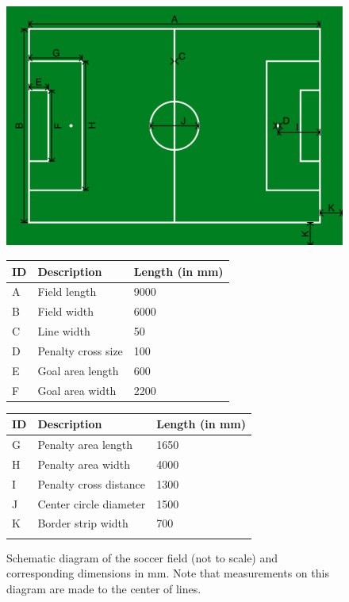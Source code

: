 \begin{figure}[b!]
\centering
\centerline{\includegraphics[width=\columnwidth]{figs/fieldDimensions2020.pdf}}
\vspace{1ex}
\begin{tabular}{| l | l | l |}
ID & Description & Length (in mm) \\
\hline \hline
A & Field length & 9000 \\
\hline
B & Field width & 6000 \\
\hline
C & Line width & 50 \\
\hline
D & Penalty cross size & 100 \\
\hline
E & Goal area length & 600 \\
\hline
F & Goal area width & 2200 \\
\end{tabular}
\begin{tabular}{|l|l|l|}
ID & Description & Length (in mm) \\
\hline \hline
G & Penalty area length & 1650 \\
\hline
H & Penalty area width & 4000 \\
\hline
I & Penalty cross distance & 1300 \\
\hline
J & Center circle diameter & 1500 \\
\hline
K & Border strip width & 700 \\
\hline
 &  &  \\
\end{tabular}
\caption{Schematic diagram of the soccer field (not to scale) and corresponding dimensions in mm.  Note that measurements on this diagram are made to the center of lines.}
\label{fig:field_dim}
\end{figure}


